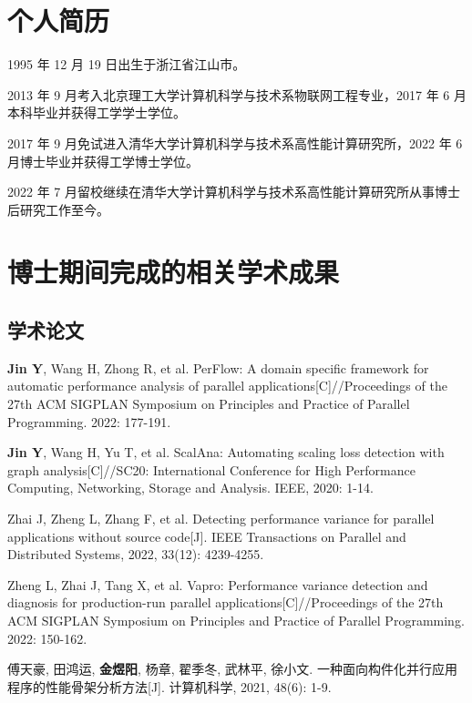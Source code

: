 
\begin{resume}

  \section*{个人简历}

  1995 年 12 月 19 日出生于浙江省江山市。

  2013 年 9 月考入北京理工大学计算机科学与技术系物联网工程专业，2017 年 6 月本科毕业并获得工学学士学位。

  2017 年 9 月免试进入清华大学计算机科学与技术系高性能计算研究所，2022 年 6 月博士毕业并获得工学博士学位。

  2022 年 7 月留校继续在清华大学计算机科学与技术系高性能计算研究所从事博士后研究工作至今。

  \section*{博士期间完成的相关学术成果}

  \subsection*{学术论文}

  \begin{achievements}
    \item \textbf{Jin Y}, Wang H, Zhong R, et al. PerFlow: A domain specific framework for automatic performance analysis of parallel applications[C]//Proceedings of the 27th ACM SIGPLAN Symposium on Principles and Practice of Parallel Programming. 2022: 177-191.
    \item \textbf{Jin Y}, Wang H, Yu T, et al. ScalAna: Automating scaling loss detection with graph analysis[C]//SC20: International Conference for High Performance Computing, Networking, Storage and Analysis. IEEE, 2020: 1-14.
    \item Zhai J, Zheng L, Zhang F, et al. Detecting performance variance for parallel applications without source code[J]. IEEE Transactions on Parallel and Distributed Systems, 2022, 33(12): 4239-4255.
    \item Zheng L, Zhai J, Tang X, et al. Vapro: Performance variance detection and diagnosis for production-run parallel applications[C]//Proceedings of the 27th ACM SIGPLAN Symposium on Principles and Practice of Parallel Programming. 2022: 150-162.
    \item 傅天豪, 田鸿运, \textbf{金煜阳}, 杨章, 翟季冬, 武林平, 徐小文. 一种面向构件化并行应用程序的性能骨架分析方法[J]. 计算机科学, 2021, 48(6): 1-9.
  \end{achievements}



\end{resume}
